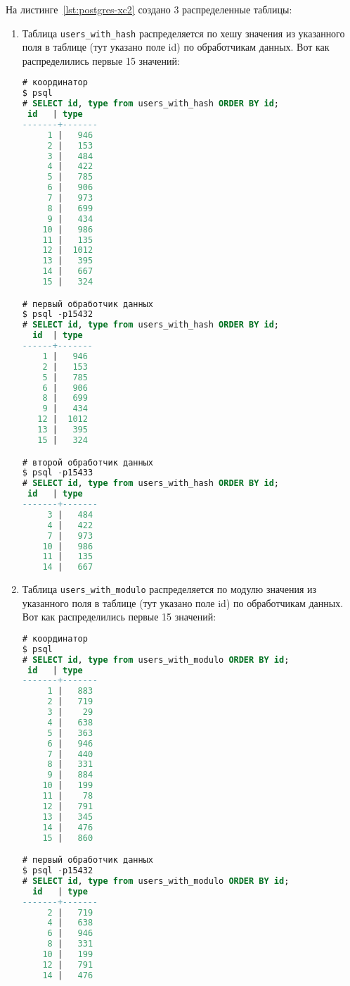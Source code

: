 На листинге~\ref{lst:postgres-xc2} создано 3 распределенные таблицы:

\begin{enumerate}
  \item Таблица \lstinline!users_with_hash! распределяется по хешу значения из указанного поля в таблице (тут указано поле id) по обработчикам данных. Вот как распределились первые 15 значений:

\begin{lstlisting}[language=SQL,label=lst:postgres-xc3,caption=Данные с координатора и обработчиков данных]
# координатор
$ psql
# SELECT id, type from users_with_hash ORDER BY id;
 id   | type
-------+-------
     1 |   946
     2 |   153
     3 |   484
     4 |   422
     5 |   785
     6 |   906
     7 |   973
     8 |   699
     9 |   434
    10 |   986
    11 |   135
    12 |  1012
    13 |   395
    14 |   667
    15 |   324

# первый обработчик данных
$ psql -p15432
# SELECT id, type from users_with_hash ORDER BY id;
  id  | type
------+-------
    1 |   946
    2 |   153
    5 |   785
    6 |   906
    8 |   699
    9 |   434
   12 |  1012
   13 |   395
   15 |   324

# второй обработчик данных
$ psql -p15433
# SELECT id, type from users_with_hash ORDER BY id;
 id   | type
-------+-------
     3 |   484
     4 |   422
     7 |   973
    10 |   986
    11 |   135
    14 |   667
\end{lstlisting}

  \item Таблица \lstinline!users_with_modulo! распределяется по модулю значения из указанного поля в таблице (тут указано поле id) по обработчикам данных. Вот как распределились первые 15 значений:

\begin{lstlisting}[language=SQL,label=lst:postgres-xc4,caption=Данные с координатора и обработчиков данных]
# координатор
$ psql
# SELECT id, type from users_with_modulo ORDER BY id;
 id   | type
-------+-------
     1 |   883
     2 |   719
     3 |    29
     4 |   638
     5 |   363
     6 |   946
     7 |   440
     8 |   331
     9 |   884
    10 |   199
    11 |    78
    12 |   791
    13 |   345
    14 |   476
    15 |   860

# первый обработчик данных
$ psql -p15432
# SELECT id, type from users_with_modulo ORDER BY id;
  id   | type
-------+-------
     2 |   719
     4 |   638
     6 |   946
     8 |   331
    10 |   199
    12 |   791
    14 |   476


\end{lstlisting}
\end{enumerate}
